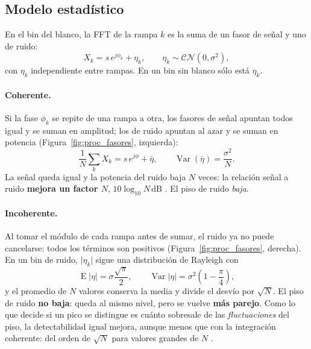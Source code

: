 \subsection{Modelo estadístico}

En el bin del blanco, la FFT de la rampa $k$ es la suma de un fasor de
señal y uno de ruido:
\begin{equation}
  X_k = s\,e^{j\phi_k} + \eta_k,
  \qquad \eta_k \sim \mathcal{CN}(0, \sigma^2),
\end{equation}
con $\eta_k$ independiente entre rampas. En un bin sin blanco sólo está
$\eta_k$.

\paragraph{Coherente.}
Si la fase $\phi_k$ se repite de una rampa a otra, los fasores de señal
apuntan todos igual y se suman en amplitud; los de ruido apuntan al azar y
se suman en potencia (Figura~\ref{fig:proc_fasores}, izquierda):
\begin{equation}
  \frac{1}{N}\sum_k X_k = s\,e^{j\phi} + \bar\eta,
  \qquad \operatorname{Var}(\bar\eta) = \frac{\sigma^2}{N}.
\end{equation}
La señal queda igual y la potencia del ruido baja $N$ veces: la relación
señal a ruido \textbf{mejora un factor $N$}, $10\log_{10}N\,\text{dB}$
\cite{Richards2014, Skolnik2001}. El piso de ruido \emph{baja}.

\paragraph{Incoherente.}
Al tomar el módulo de cada rampa antes de sumar, el ruido ya no puede
cancelarse: todos los términos son positivos
(Figura~\ref{fig:proc_fasores}, derecha). En un bin de ruido, $\lvert
\eta_k\rvert$ sigue una distribución de Rayleigh con
\begin{equation}
  \operatorname{E}\lvert\eta\rvert = \sigma\frac{\sqrt{\pi}}{2},
  \qquad
  \operatorname{Var}\lvert\eta\rvert = \sigma^2\left(1 - \frac{\pi}{4}\right),
  \label{eq:proc_rayleigh}
\end{equation}
y el promedio de $N$ valores conserva la media y divide el desvío por
$\sqrt N$. El piso de ruido \textbf{no baja}: queda al mismo nivel, pero se
vuelve \textbf{más parejo}. Como lo que decide si un pico se distingue es
cuánto sobresale de las \emph{fluctuaciones} del piso, la detectabilidad
igual mejora, aunque menos que con la integración coherente: del orden de
$\sqrt N$ para valores grandes de $N$ \cite{Richards2014}.

